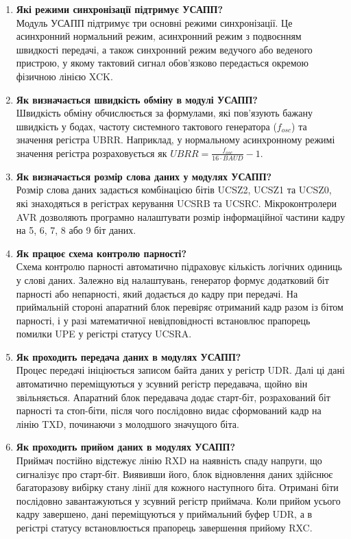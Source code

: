 \documentclass[14pt, a4paper]{extreport}
\begin{document}
\begin{enumerate}
		\item \textbf{Які режими синхронізації підтримує УСАПП?} \\ Модуль УСАПП підтримує три основні режими синхронізації. Це асинхронний нормальний режим, асинхронний режим з подвоєнням швидкості передачі, а також синхронний режим ведучого або веденого пристрою, у якому тактовий сигнал обов'язково передається окремою фізичною лінією XCK.
		
		\item \textbf{Як визначається швидкість обміну в модулі УСАПП?} \\ Швидкість обміну обчислюється за формулами, які пов'язують бажану швидкість у бодах, частоту системного тактового генератора ($f_{osc}$) та значення регістра UBRR. Наприклад, у нормальному асинхронному режимі значення регістра розраховується як $UBRR = \frac{f_{osc}}{16 \cdot BAUD} - 1$.
		
		\item \textbf{Як визначається розмір слова даних у модулях УСАПП?} \\ Розмір слова даних задається комбінацією бітів UCSZ2, UCSZ1 та UCSZ0, які знаходяться в регістрах керування UCSRB та UCSRC. Мікроконтролери AVR дозволяють програмно налаштувати розмір інформаційної частини кадру на 5, 6, 7, 8 або 9 біт даних.
		
		\item \textbf{Як працює схема контролю парності?} \\ Схема контролю парності автоматично підраховує кількість логічних одиниць у слові даних. Залежно від налаштувань, генератор формує додатковий біт парності або непарності, який додається до кадру при передачі. На приймальній стороні апаратний блок перевіряє отриманий кадр разом із бітом парності, і у разі математичної невідповідності встановлює прапорець помилки UPE у регістрі статусу UCSRA.
		
		\item \textbf{Як проходить передача даних в модулях УСАПП?} \\ Процес передачі ініціюється записом байта даних у регістр UDR. Далі ці дані автоматично переміщуються у зсувний регістр передавача, щойно він звільняється. Апаратний блок передавача додає старт-біт, розрахований біт парності та стоп-біти, після чого послідовно видає сформований кадр на лінію TXD, починаючи з молодшого значущого біта.
		
		\item \textbf{Як проходить прийом даних в модулях УСАПП?} \\ Приймач постійно відстежує лінію RXD на наявність спаду напруги, що сигналізує про старт-біт. Виявивши його, блок відновлення даних здійснює багаторазову вибірку стану лінії для кожного наступного біта. Отримані біти послідовно завантажуються у зсувний регістр приймача. Коли прийом усього кадру завершено, дані переміщуються у приймальний буфер UDR, а в регістрі статусу встановлюється прапорець завершення прийому RXC.
		

\end{enumerate}
\end{document}

